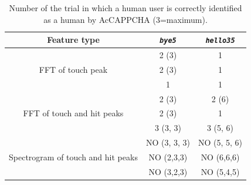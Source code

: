 \begin{table}[H]
\centering\footnotesize
\begin{tabular}{ccc}
\hline
{\textbf{Feature type}}&{\texttt{\textit{bye5}}}&{\texttt{\textit{hello35}}}\\
\hline
\multirow{3}{*}{FFT of touch peak} & {2 (3)} & {1}\\
& {2 (3)} & {1}\\
& {1} & {1}\\
\hline
\multirow{3}{*}{FFT of touch and hit peaks} & {2 (3)} & {2 (6)}\\
& {2 (3)} & {1}\\
& {3 (3, 3)} & {3 (5, 6)}\\
\hline
\multirow{3}{*}{Spectrogram of touch and hit peaks} & {NO (3, 3, 3)} & {NO (5, 5, 6)}\\
& {NO (2,3,3)} & {NO (6,6,6)}\\
& {NO (3,2,3)} & {NO (5,4,5)}\\
\hline
\end{tabular}
\caption{\footnotesize{Number of the trial in which a human user is correctly identified as a human by AcCAPPCHA (3=maximum).}}
\label{Results:verification}
\end{table}

